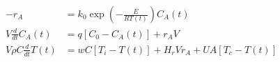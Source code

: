 \begin{equation}
  \begin{aligned}
    - r_A                     & = k_0 \exp(-\frac{E}{RT(t)}) C_A(t)
    \\
    V\frac{d}{dt}C_A(t)       & = q [C_0 - C_A(t)] + r_A V
    \\
    V \rho C \frac{d}{dt}T(t) & = w C [T_i - T(t)] + H_r V r_A + U A [T_c - T(t)]
  \end{aligned}
  \label{eq:CSTR_1storder01_2}
\end{equation}
